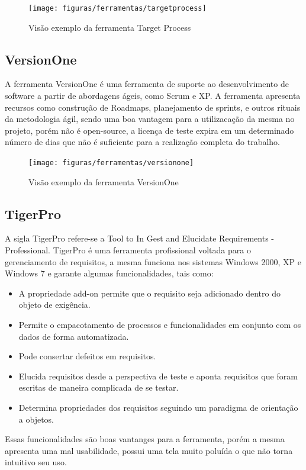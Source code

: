 \begin{figure}[!htpb]
\centering
\texttt{[image: figuras/ferramentas/targetprocess]}
\caption{Visão exemplo da ferramenta Target Process}
\end{figure}


\subsection{VersionOne}
A ferramenta VersionOne é uma ferramenta de suporte ao desenvolvimento de software a partir de abordagens ágeis, como Scrum e XP.
A ferramenta apresenta recursos como construção de Roadmaps, planejamento de sprints, e outros rituais da metodologia ágil, sendo uma boa vantagem para a utilizacação da mesma no projeto, porém não é open-source, a licença de teste expira em um determinado número de dias que não é suficiente para a realização completa do trabalho.

\begin{figure}[!htpb]
\centering
\texttt{[image: figuras/ferramentas/versionone]}
\caption{Visão exemplo da ferramenta VersionOne}
\end{figure}

\subsection{TigerPro}

A sigla TigerPro refere-se a Tool to In Gest and Elucidate Requirements - Professional.
TigerPro é uma ferramenta profissional voltada para o gerenciamento de requisitos, a mesma funciona nos sistemas Windows 2000, XP e Windows 7 e garante algumas funcionalidades, tais como:
\begin{itemize}
\item A propriedade add-on permite que o requisito seja adicionado dentro do objeto de exigência.
\item Permite o empacotamento de processos e funcionalidades em conjunto com os dados de forma automatizada.
\item Pode consertar defeitos em requisitos.
\item Elucida requisitos desde a perspectiva de teste e aponta requisitos que foram escritas de maneira complicada de se testar.
\item Determina propriedades dos requisitos seguindo um paradigma de orientação a objetos.
\end{itemize}

Essas funcionalidades são boas vantanges para a ferramenta, porém a mesma apresenta uma mal usabilidade, possui uma tela muito poluída o que não torna intuitivo seu uso.

